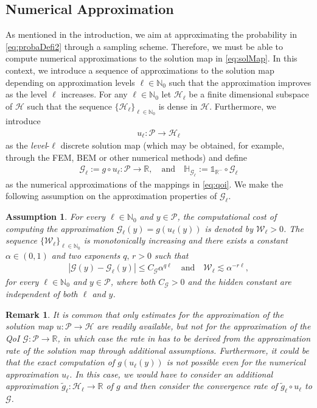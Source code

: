 \documentclass{article}
\newtheorem{remark}[theorem]{Remark}
\newtheorem{assumption}[theorem]{Assumption}
\newcommand{\cG}{\mathcal{G}}
\newcommand{\cH}{\mathcal{H}}
\newcommand{\cP}{\mathcal{P}}
\newcommand{\cW}{\mathcal{W}}
\newcommand{\IH}{\mathbb{H}}
\newcommand{\IN}{\mathbb{N}}
\newcommand{\IR}{\mathbb{R}}
\newcommand{\bOne}{\mathds{1}}
\newcommand{\abs}[1]{{\left\vert #1 \right\vert}}
\theoremstyle{definition}
\begin{document}
\subsection{Numerical Approximation}
\label{ssec:numApr}
As mentioned in the introduction, we aim at approximating the
probability in \cref{eq:probaDefi2} through a sampling scheme. Therefore, we must be able
to compute numerical approximations to the solution map in \cref{eq:solMap}.
In this context, we introduce a sequence of approximations to the
solution map depending on approximation levels $\ell\in\IN_{0}$
such that the approximation improves as the level $\ell$ increases. For any
$\ell\in\IN_{0}$ let $\cH_{\ell}$ be a finite dimensional subspace of $\cH$
such that the sequence $\{\cH_{\ell}\}_{\ell\in\IN_0}$ is dense in $\cH$.
Furthermore, we introduce
\begin{align}
  \label{eq:numSol}
  u_\ell:\cP\to\cH_\ell
\end{align}
as the \emph{level}-$\ell$ discrete solution map (which may be obtained, for example,
through the FEM, BEM or other numerical methods) and define
\begin{align}
  \label{eq:numqoi}
  \cG_\ell:=g\circ u_\ell:\cP\to\IR,\quad\text{and}\quad\IH_{\cG_\ell}:=\bOne_{\IR^{-}}\circ\cG_\ell
\end{align}
as the numerical approximations of the mappings in \cref{eq:qoi}. We make the following assumption
on the approximation properties of $\cG_\ell$.
\begin{assumption}
  \label{as:numap}
  For every $\ell\in\IN_0$ and $y\in\cP$, the computational cost of computing the
  approximation $\cG_\ell(y)=g(u_\ell(y))$ is denoted by $\cW_\ell>0$. The sequence
  $\{\cW_\ell\}_{\ell\in\IN_0}$ is monotonically increasing and there exists a constant
  $\alpha\in(0,1)$ and two exponents $q,\,r>0$ such that
  \begin{align*}
    \abs{\cG(y)-\cG_\ell(y)}\leq C_{\cG}\alpha^{q\ell}\quad\text{and}\quad \cW_\ell \lesssim\alpha^{-r\ell},
  \end{align*}
  for every $\ell\in\IN_0$ and $y\in\cP$, where both $C_{\cG}>0$ and the hidden constant are independent of both $\ell$ and $y$.
\end{assumption}
\begin{remark}
It is common that only estimates for the approximation of the solution map $u:\cP\to\cH$ are readily
available, but not for the approximation of the QoI $\cG:\cP\to\IR$, in which case the rate in
 has to be derived from the approximation rate of the solution map through additional
assumptions. Furthermore, it could be that the exact computation of $g(u_\ell(y))$ is not
possible even for the numerical approximation $u_\ell$. In this case, we would have to consider an
additional approximation $\tilde{g}_\ell:\cH_\ell\to\IR$ of $g$ and then consider 
the convergence rate of $\tilde{g}_\ell\circ u_\ell$ to $\cG$.
\end{remark}
\end{document}
